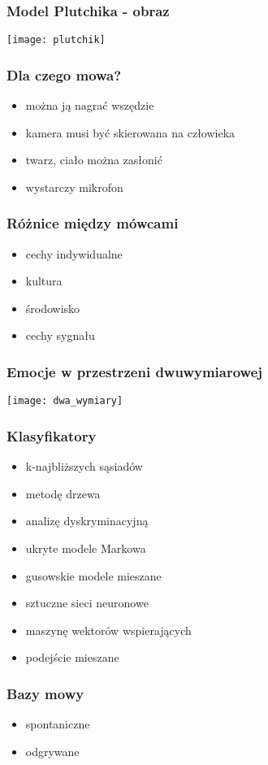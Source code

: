\documentclass{beamer}
\begin{document}
\begin{frame}
  \frametitle{Model Plutchika - obraz}
    \texttt{[image: plutchik]}
\end{frame}
\begin{frame}
  \frametitle{Dla czego mowa?}
  \begin{itemize}
    \item można ją nagrać wszędzie
    \item kamera musi być skierowana na człowieka
    \item twarz, ciało można zasłonić
    \item wystarczy mikrofon
  \end{itemize}
\end{frame}
\begin{frame}
  \frametitle{Różnice między mówcami}
  \begin{itemize}
    \item cechy indywidualne
    \item kultura
    \item środowisko
    \item cechy sygnału %
  \end{itemize}
\end{frame}
\begin{frame}
  \frametitle{Emocje w przestrzeni dwuwymiarowej}
    \texttt{[image: dwa\_wymiary]}
\end{frame}
\begin{frame}
  \frametitle{Klasyfikatory}
  \begin{itemize}
        \item k-najbliższych sąsiadów
	\item metodę drzewa
	\item analizę dyskryminacyjną
	\item ukryte modele Markowa
	\item gusowskie modele mieszane
	\item sztuczne sieci neuronowe
        \item maszynę wektorów wspierających
        \item podejście mieszane
  \end{itemize}
\end{frame}
\begin{frame}
  \frametitle{Bazy mowy}
  \begin{itemize}
    \item spontaniczne
    \item odgrywane
  \end{itemize}
\end{frame}
\end{document}

